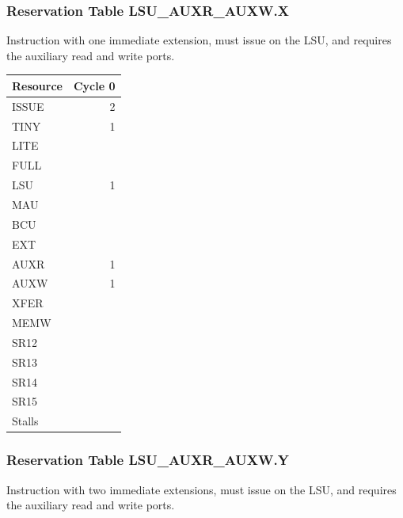 \subsubsection{Reservation Table LSU\_AUXR\_AUXW.X} \label{sec:reservation-LSU-AUXR-AUXW.X}

Instruction with one immediate extension, must issue on the LSU, and requires the auxiliary read and write ports.
\medskip

\begin{tabular}{|l|r|} \hline
Resource	& Cycle 0 \\ \hline
\textsf{ISSUE}	& 2	\\
\textsf{TINY}	& 1	\\
\textsf{LITE}	& 	\\
\textsf{FULL}	& 	\\
\textsf{LSU}	& 1	\\
\textsf{MAU}	& 	\\
\textsf{BCU}	& 	\\
\textsf{EXT}	& 	\\
\textsf{AUXR}	& 1	\\
\textsf{AUXW}	& 1	\\
\textsf{XFER}	& 	\\
\textsf{MEMW}	& 	\\
\textsf{SR12}	& 	\\
\textsf{SR13}	& 	\\
\textsf{SR14}	& 	\\
\textsf{SR15}	& 	\\
\hline Stalls	& 	\\
\hline \end{tabular}

\subsubsection{Reservation Table LSU\_AUXR\_AUXW.Y} \label{sec:reservation-LSU-AUXR-AUXW.Y}

Instruction with two immediate extensions, must issue on the LSU, and requires the auxiliary read and write ports.
\medskip

